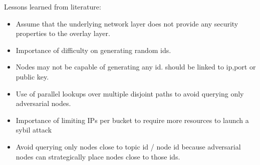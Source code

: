 



Lessons learned from literature:
\begin{itemize}
\item Assume that the underlying network layer does not provide any security properties to the overlay layer.
\item Importance of difficulty on generating random ids.
\item Nodes may not be capable of generating any id. should be linked to ip,port or public key.
\item  Use of  parallel lookups over multiple disjoint paths to avoid querying only adversarial nodes.
\item Importance of limiting IPs per bucket to require more resources to launch a sybil attack 
\item Avoid querying only nodes close to topic id / node id because adversarial nodes can strategically place nodes close to those ids.
\end{itemize}

